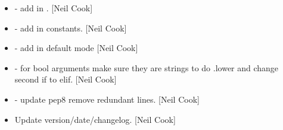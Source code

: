 \documentclass[a4paper,10pt,english]{report}
\begin{document}
\begin{itemize}
\item {} 
 - add in . {[}Neil Cook{]}

\item {} 
 - add in 
constants. {[}Neil Cook{]}

\item {} 
 - add in default mode  {[}Neil
Cook{]}

\item {} 
 - for bool arguments make sure
they are strings to do .lower and change second if to elif. {[}Neil
Cook{]}

\item {} 
 - update pep8 remove redundant lines. {[}Neil
Cook{]}

\item {} 
Update version/date/changelog. {[}Neil Cook{]}

\end{itemize}
\end{document}
